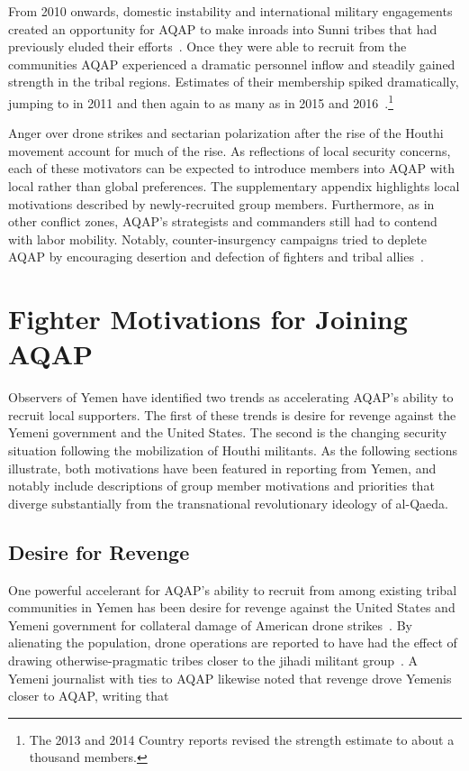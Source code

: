  From 2010 onwards, domestic instability and international military engagements created an opportunity for AQAP to make inroads into Sunni tribes that had previously eluded their efforts~\autocite{guardian2015yemen}.  Once they were able to recruit from the communities AQAP experienced a dramatic personnel inflow and steadily gained strength in the tribal regions. Estimates of their membership spiked dramatically, jumping to  in 2011 and then again to as many as  in 2015 and 2016~\autocite[395]{ctr2011terrorism, ctr2015terrorism}.\footnote{The 2013 and 2014 Country reports revised the strength estimate to about a thousand members.} 
 
 Anger over drone strikes and sectarian polarization after the rise of the Houthi movement account for much of the rise. As reflections of local security concerns, each of these motivators can be expected to introduce members into AQAP with local rather than global preferences. The supplementary appendix highlights local motivations described by newly-recruited group members. Furthermore, as in other conflict zones, AQAP's strategists and commanders still had to contend with labor mobility. Notably, counter-insurgency campaigns tried to deplete AQAP by encouraging desertion and defection of fighters and tribal allies~\autocite{kendall2018impact}.
 

\section{Fighter Motivations for Joining AQAP}
Observers of Yemen have identified two trends as accelerating AQAP’s ability to recruit local supporters. The first of these trends is desire for revenge against the Yemeni government and the United States\autocite{batal2010assessment}. The second is the changing security situation following the mobilization of Houthi militants. As the following sections illustrate, both motivations have been featured in reporting from Yemen, and notably include descriptions of group member motivations and priorities that diverge substantially from the transnational revolutionary ideology of al-Qaeda.

\subsection{Desire for Revenge}
One powerful accelerant for AQAP's ability to recruit from among existing tribal communities in Yemen has been desire for revenge against the United States and Yemeni government for collateral damage of American drone strikes~\autocite{reuters2013yemen, kendall2018contemporary}. By alienating the population, drone operations are reported to have had the effect of drawing otherwise-pragmatic tribes closer to the jihadi militant group~\autocite{mothana2012}.  A Yemeni journalist with ties to
AQAP likewise noted that revenge drove Yemenis closer to AQAP, writing
that ~\autocite{reuters2013yemen}

